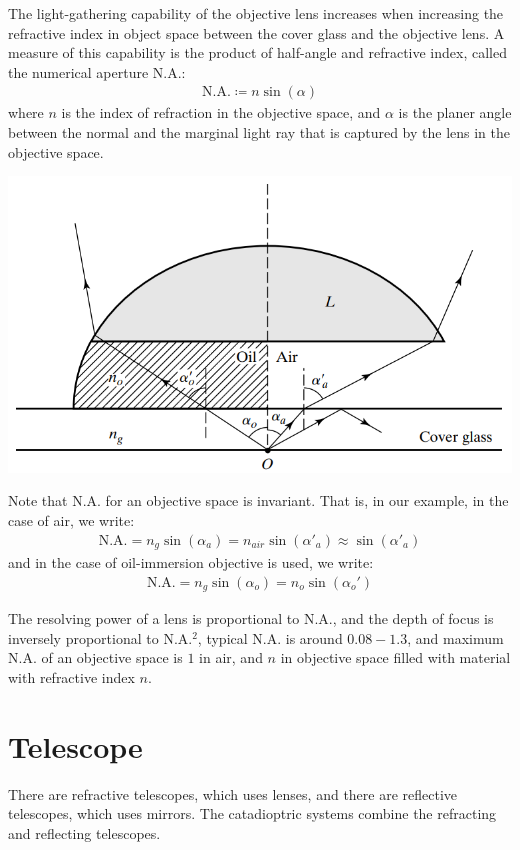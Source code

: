 \documentclass[11pt]{book}
\theoremstyle{break}
\theoremstyle{break}
\begin{document}
The light-gathering capability of the objective lens increases when increasing the refractive index in object space between the cover glass and the objective lens. A measure of this capability is the product of half-angle and refractive index, called the numerical aperture N.A.:
\begin{align*}
\text{N.A.} \coloneqq n \sin(\alpha)
\end{align*}
where $n$ is the index of refraction in the objective space, and $\alpha$ is the planer angle between the normal and the marginal light ray that is captured by the lens in the objective space. 

\begin{center}
\includegraphics[scale=0.57]{NA.png}
\end{center}

Note that N.A. for an objective space is invariant. That is, in our example, in the case of air, we write:
\begin{align*}
\text{N.A.} = n_g \sin(\alpha_a) = n_{air}\sin(\alpha'_a) \approx \sin(\alpha'_a) 
\end{align*}
and in the case of oil-immersion objective is used, we write:
\begin{align*}
\text{N.A.} = n_g \sin(\alpha_o) = n_o \sin(\alpha_o')
\end{align*}




 The resolving power of a lens is proportional to N.A., and the depth of focus is inversely proportional to N.A.$^2$, typical N.A. is around $0.08-1.3$, and maximum N.A. of an objective space is $1$ in air, and $n$ in objective space filled with material with refractive index $n$. 

\newpage
\section[Telescope]{\color{red} Telescope\color{black}}
There are refractive telescopes, which uses lenses, and there are reflective telescopes, which uses mirrors. The catadioptric systems combine the refracting and reflecting telescopes.\\
\end{document}
